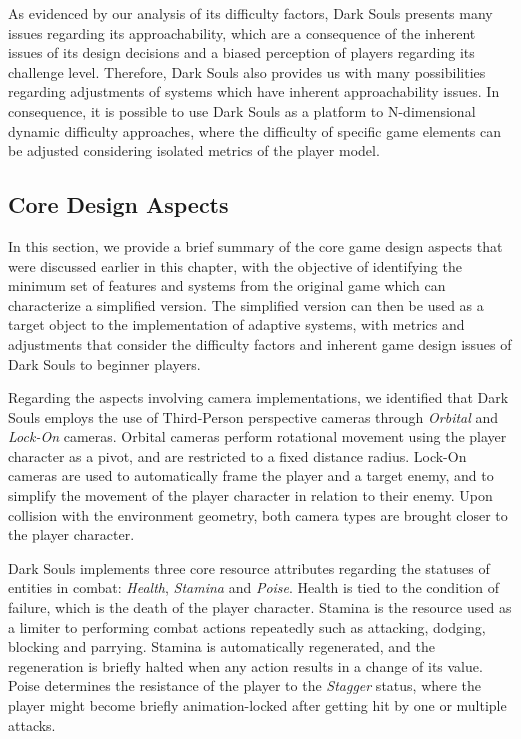 As evidenced by our analysis of its difficulty factors, Dark Souls presents many issues regarding its approachability, which are a consequence of the inherent issues of its design decisions and a biased perception of players regarding its challenge level. Therefore, Dark Souls also provides us with many possibilities regarding adjustments of systems which have inherent approachability issues. In consequence, it is possible to use Dark Souls as a platform to N-dimensional dynamic difficulty approaches, where the difficulty of specific game elements can be adjusted considering isolated metrics of the player model.

\subsection{Core Design Aspects}

In this section, we provide a brief summary of the core game design aspects that were discussed earlier in this chapter, with the objective of identifying the minimum set of features and systems from the original game which can characterize a simplified version. The simplified version can then be used as a target object to the implementation of adaptive systems, with metrics and adjustments that consider the difficulty factors and inherent game design issues of Dark Souls to beginner players.

Regarding the aspects involving camera implementations, we identified that Dark Souls employs the use of Third-Person perspective cameras through \emph{Orbital} and \emph{Lock-On} cameras. Orbital cameras perform rotational movement using the player character as a pivot, and are restricted to a fixed distance radius. Lock-On cameras are used to automatically frame the player and a target enemy, and to simplify the movement of the player character in relation to their enemy. Upon collision with the environment geometry, both camera types are brought closer to the player character.

Dark Souls implements three core resource attributes regarding the statuses of entities in combat: \emph{Health}, \emph{Stamina} and \emph{Poise}. Health is tied to the condition of failure, which is the death of the player character. Stamina is the resource used as a limiter to performing combat actions repeatedly such as attacking, dodging, blocking and parrying. Stamina is automatically regenerated, and the regeneration is briefly halted when any action results in a change of its value. Poise determines the resistance of the player to the \emph{Stagger} status, where the player might become briefly animation-locked after getting hit by one or multiple attacks.

